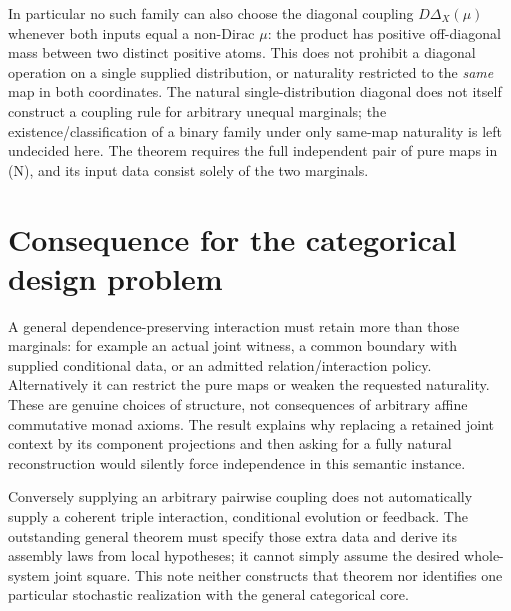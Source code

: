 \documentclass[11pt]{article}
\begin{document}
In particular no such family can also choose the diagonal coupling $D\Delta_X(\mu)$ whenever both inputs equal a non-Dirac $\mu$: the product has positive off-diagonal mass between two distinct positive atoms. This does not prohibit a diagonal operation on a single supplied distribution, or naturality restricted to the \emph{same} map in both coordinates. The natural single-distribution diagonal does not itself construct a coupling rule for arbitrary unequal marginals; the existence/classification of a binary family under only same-map naturality is left undecided here. The theorem requires the full independent pair of pure maps in (N), and its input data consist solely of the two marginals.

\section{Consequence for the categorical design problem}
A general dependence-preserving interaction must retain more than those marginals: for example an actual joint witness, a common boundary with supplied conditional data, or an admitted relation/interaction policy. Alternatively it can restrict the pure maps or weaken the requested naturality. These are genuine choices of structure, not consequences of arbitrary affine commutative monad axioms. The result explains why replacing a retained joint context by its component projections and then asking for a fully natural reconstruction would silently force independence in this semantic instance.

Conversely supplying an arbitrary pairwise coupling does not automatically supply a coherent triple interaction, conditional evolution or feedback. The outstanding general theorem must specify those extra data and derive its assembly laws from local hypotheses; it cannot simply assume the desired whole-system joint square. This note neither constructs that theorem nor identifies one particular stochastic realization with the general categorical core.
\end{document}
